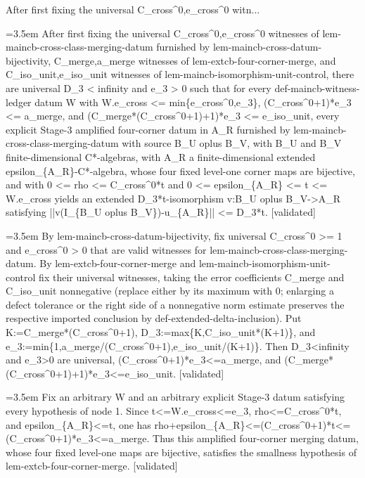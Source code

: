 \documentclass{article}
\newcommand{\step}[1]{\par\noindent\hangindent=3.5em\hangafter=1%
  \makebox[3.5em][l]{\textbf{#1.}}}
\newcommand{\steptag}[1]{\hfill{\small\textsf{[#1]}}}
\begin{document}
\begin{proofbox}{After first fixing the universal C\_cross\textasciicircum{}0,e\_cross\textasciicircum{}0 witn...}
\step{1} After first fixing the universal C\_cross\textasciicircum{}0,e\_cross\textasciicircum{}0 witnesses of lem-maincb-cross-class-merging-datum furnished by lem-maincb-cross-datum-bijectivity, C\_merge,a\_merge witnesses of lem-extcb-four-corner-merge, and C\_iso\_unit,e\_iso\_unit witnesses of lem-maincb-isomorphism-unit-control, there are universal D\_3 < infinity and e\_3 > 0 such that for every def-maincb-witness-ledger datum W with W.e\_cross <= min\{e\_cross\textasciicircum{}0,e\_3\}, (C\_cross\textasciicircum{}0+1)*e\_3 <= a\_merge, and (C\_merge*(C\_cross\textasciicircum{}0+1)+1)*e\_3 <= e\_iso\_unit, every explicit Stage-3 amplified four-corner datum in A\_R furnished by lem-maincb-cross-class-merging-datum with source B\_U oplus B\_V, with B\_U and B\_V finite-dimensional C*-algebras, with A\_R a finite-dimensional extended epsilon\_\{A\_R\}-C*-algebra, whose four fixed level-one corner maps are bijective, and with 0 <= rho <= C\_cross\textasciicircum{}0*t and 0 <= epsilon\_\{A\_R\} <= t <= W.e\_cross yields an extended D\_3*t-isomorphism v:B\_U oplus B\_V->A\_R satisfying ||v(I\_\{B\_U oplus B\_V\})-u\_\{A\_R\}|| <= D\_3*t. \steptag{validated} \\[6pt]
\step{1.1} By lem-maincb-cross-datum-bijectivity, fix universal C\_cross\textasciicircum{}0 >= 1 and e\_cross\textasciicircum{}0 > 0 that are valid witnesses for lem-maincb-cross-class-merging-datum. By lem-extcb-four-corner-merge and lem-maincb-isomorphism-unit-control fix their universal witnesses, taking the error coefficients C\_merge and C\_iso\_unit nonnegative (replace either by its maximum with 0; enlarging a defect tolerance or the right side of a nonnegative norm estimate preserves the respective imported conclusion by def-extended-delta-inclusion). Put K:=C\_merge*(C\_cross\textasciicircum{}0+1), D\_3:=max\{K,C\_iso\_unit*(K+1)\}, and e\_3:=min\{1,a\_merge/(C\_cross\textasciicircum{}0+1),e\_iso\_unit/(K+1)\}. Then D\_3<infinity and e\_3>0 are universal, (C\_cross\textasciicircum{}0+1)*e\_3<=a\_merge, and (C\_merge*(C\_cross\textasciicircum{}0+1)+1)*e\_3<=e\_iso\_unit. \steptag{validated} \\[4pt]
\step{1.2} Fix an arbitrary W and an arbitrary explicit Stage-3 datum satisfying every hypothesis of node 1. Since t<=W.e\_cross<=e\_3, rho<=C\_cross\textasciicircum{}0*t, and epsilon\_\{A\_R\}<=t, one has rho+epsilon\_\{A\_R\}<=(C\_cross\textasciicircum{}0+1)*t<=(C\_cross\textasciicircum{}0+1)*e\_3<=a\_merge. Thus this amplified four-corner merging datum, whose four fixed level-one maps are bijective, satisfies the smallness hypothesis of lem-extcb-four-corner-merge. \steptag{validated} \\[4pt]

\end{proofbox}
\end{document}
